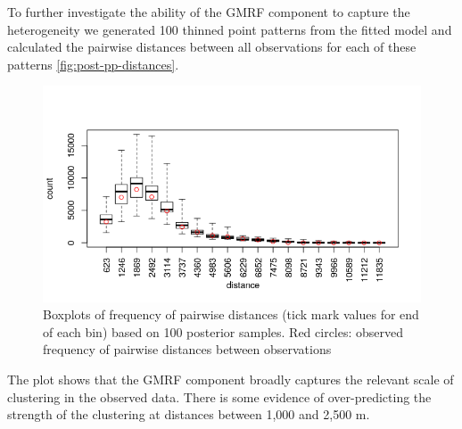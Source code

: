\documentclass[preprint,12pt]{elsarticle}
\begin{document}
To further investigate the ability of the GMRF component to capture the heterogeneity we generated 100 thinned point patterns from the fitted model and calculated the pairwise distances between all observations for each of these patterns \autoref{fig:post-pp-distances}.  
\begin{figure}[h]
	\begin{center}
		\includegraphics[scale=0.6]{figures/post_pp_distances.png}
		\caption{Boxplots of frequency of pairwise distances (tick mark values for end of each bin) based on 100 posterior samples.  Red circles: observed frequency of pairwise distances between observations}
		\label{fig:post-pp-distances}
	\end{center}
\end{figure}
The plot shows that the GMRF component broadly captures the relevant scale of clustering in the observed data.  There is some evidence of over-predicting the strength of the clustering at distances between 1,000 and 2,500 m.  
\end{document}
